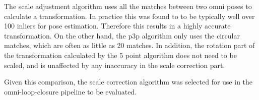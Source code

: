The scale adjustment algorithm uses all the matches between two omni poses to calculate a transformation.  In practice this was found to to be typically well over 100 inliers for pose estimation.  Therefore this results in a highly accurate transformation.  On the other hand, the p3p algorithm only uses the circular matches, which are often as little as 20 matches.  In addition, the rotation part of the transformation calculated by the 5 point algorithm does not need to be scaled, and is unaffected by any inaccuracy in the scale correction part.



Given this comparison, the scale correction algorithm was selected for use in the omni-loop-closure pipeline to be evaluated.

\newpage


